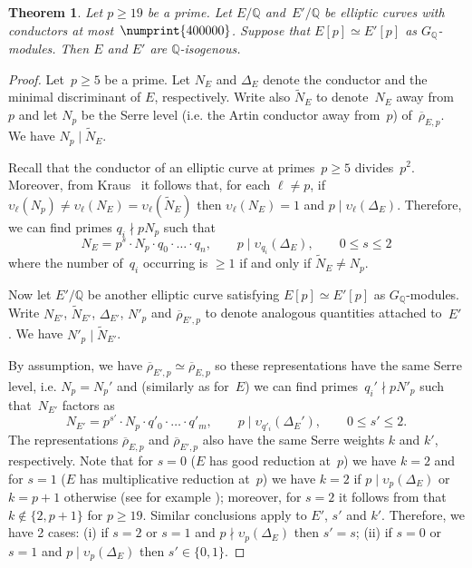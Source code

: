 \documentclass[12pt]{amsart}
\newcommand{\Q}{\mathbb{Q}}
\newcommand{\rhobar}{{\overline{\rho}}}
\newcommand{\vv}{\upsilon}
\numberwithin{equation}{section}
\newtheorem{theorem}{Theorem}[section]
\theoremstyle{definition}
\theoremstyle{remark}
\begin{document}
\begin{theorem}
 \label{T:cong19}
 Let $p \geq 19$ be a prime. Let $E/\Q$ and~$E'/\Q$ be elliptic curves
 with conductors at most~$\numprint{400000}$.  Suppose that $E[p]
 \simeq E'[p]$ as $G_\Q$-modules. Then $E$ and $E'$ are
 $\Q$-isogenous.
 \end{theorem}
\begin{proof} Let~$p \geq 5$ be a prime. Let $N_E$ and $\Delta_E$ 
denote the conductor and the minimal discriminant of $E$, respectively. Write also $\tilde{N}_E$ to denote~$N_E$ away from~$p$ and let $N_p$ be the Serre level (i.e. the Artin conductor away from~$p$) of~$\rhobar_{E,p}$. 
We have $N_p \mid \tilde{N}_E$.

Recall that the conductor of an elliptic curve at primes~$p \geq 5$ divides~$p^2$. Moreover, from Kraus~\cite[p. 30]{KrausThesis}
it follows that, for each $\ell \neq p$, if 
$\vv_{\ell}(N_p) \neq \vv_{\ell}(N_E) = \vv_{\ell}(\tilde{N}_E)$ then
$\vv_{\ell}(N_E) = 1$ and $p \mid \vv_{\ell}(\Delta_E)$.
Therefore, we can find primes $q_i \nmid pN_p$ such that 
\begin{equation}\label{E:condE}
  N_E = p^s \cdot N_p \cdot q_0 \cdot \ldots \cdot q_n, 
 \qquad p \mid \vv_{q_i}(\Delta_E), \qquad 0 \leq s \leq 2
\end{equation}
where the number of~$q_i$ occurring is $\geq 1$ if and only if 
$\tilde{N}_E \neq N_p$. 

Now let $E'/\Q$ be another elliptic curve satisfying $E[p] \simeq E'[p]$ as $G_\Q$-modules. Write $N_{E'}$, $\tilde{N}_{E'}$, $\Delta_{E'}$, $N'_p$ and $\rhobar_{E',p}$ to denote analogous quantities attached to~$E'$. We have $N'_p \mid \tilde{N}_{E'}$.

By assumption, we have $\rhobar_{E',p} \simeq \rhobar_{E,p}$ so these representations have the same Serre level, i.e. $N_p = N_p'$ and (similarly as for~$E$) we can find primes~$q_i' \nmid pN'_p$ such that~$N_{E'}$ factors as
\begin{equation}\label{E:condE'}
 N_{E'} = p^{s'} \cdot N_p \cdot q'_0 \cdot \ldots \cdot q'_m, 
 \qquad p \mid \vv_{q'_i}(\Delta_E'),
 \qquad 0 \leq s' \leq 2.
\end{equation}
The representations $\rhobar_{E,p}$ and $\rhobar_{E',p}$ also have the same Serre weights $k$ and $k'$, respectively. Note that for $s=0$ ($E$ has good reduction at~$p$) we have $k=2$ and for $s=1$ ($E$ has multiplicative reduction at~$p$) we have $k=2$ if $p \mid \vv_p(\Delta_E)$ or $k=p+1$ otherwise (see for example \cite[p. 3]{KrausThesis}); moreover, for $s=2$ it follows from \cite[Th\'eor\`eme 1]{KrausThesis} that $k \not\in \{2, p+1\}$ 
for $p \geq 19$. Similar conclusions apply to $E'$, $s'$ and $k'$. 
Therefore, we have 2 cases: (i) if $s = 2$ or $s=1$ and $p \nmid \vv_{p}(\Delta_E)$ then $s'=s$; (ii) if $s=0$ or $s=1$ and $p \mid \vv_{p}(\Delta_E)$ then $s' \in \{0,1 \}$.


\end{proof}
\end{document}
